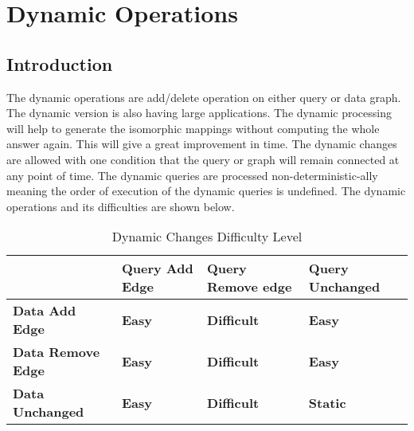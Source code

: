 \chapter{Dynamic Operations}
 \label{chap:dynamic}
 \section{Introduction}
	\hspace{10mm} The dynamic operations are add/delete operation on either query or data graph. The dynamic version is also having large applications. The dynamic processing will help to generate the isomorphic mappings without computing the whole answer again. This will give a great improvement in time. The dynamic changes are allowed with one condition that the query or graph will remain connected at any point of time. The dynamic queries are processed non-deterministic-ally meaning the order of execution of the dynamic queries is undefined. 
	\hspace{10mm} The dynamic operations and its difficulties are shown below.
	\begin{table}[H]
\centering
\begin{tabular}{|m{4cm}|m{4cm}|m{4cm}|m{4cm}|}
\hline
\textbf{}                                  & \textbf{Query Add Edge}                     & \textbf{Query Remove edge}                                 & \textbf{Query Unchanged} \\ \hline
\textbf{Data Add Edge}                                  & \textbf{Easy}                     & \textbf{Difficult}                                 & \textbf{Easy} \\ \hline
\textbf{Data Remove Edge}                                  & \textbf{Easy}                     & \textbf{Difficult}                                 & \textbf{Easy} \\ \hline
\textbf{Data Unchanged}                                  & \textbf{Easy}                     & \textbf{Difficult}                                 & \textbf{Static} \\ \hline
\end{tabular}
\caption{Dynamic Changes Difficulty Level}
\end{table}
